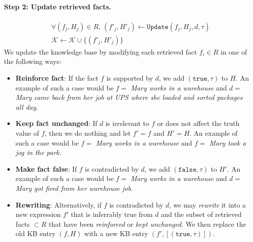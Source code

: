 \documentclass[11pt]{article}
\newcommand{\doc}{d}
\newcommand{\kb}{\mathcal{K}}
\newcommand{\fact}{f}
\newcommand{\facthist}{H}
\newcommand{\timestamp}{\tau}
\begin{document}
\paragraph{Step 2: Update retrieved facts.} 
\begin{align}
    &\forall (\fact_j, \facthist_j) \in R, \, (\fact'_j, \facthist'_j) \leftarrow \texttt{Update}(\fact_j,\facthist_j,\doc,\timestamp) \nonumber \\
    & \kb \gets \kb \cup \{(\fact'_j, \facthist'_j)\}
\end{align}
We update the knowledge base by modifying each retrieved fact $f_i\in R$ in one of the following ways:
\begin{itemize}
    \item \textbf{Reinforce fact}: If the fact $\fact$ is supported by $\doc$, we add $(\texttt{true}, \timestamp)$ to $\facthist$. An example of such a case would be $\fact =$ \textit{Mary works in a warehouse} and $\doc =$ \textit{Mary came back from her job at UPS where she loaded and sorted packages all day}.
    
    \item \textbf{Keep fact unchanged}: If $\doc$ is irrelevant to $\fact$ or does not affect the truth value of $\fact$, then we do nothing and let $\fact' = \fact$ and $\facthist' = \facthist$. An example of such a case would be $\fact =$ \textit{Mary works in a warehouse} and $\fact = $ \textit{Mary took a jog in the park}.

    \item \textbf{Make fact false}: If $\fact$ is contradicted by $\doc$, we add $(\texttt{false}, \tau)$ to $\facthist'$. An example of such a case would be $\fact =$ \textit{Mary works in a warehouse} and $\doc = $ \textit{Mary got fired from her warehouse job}.

    \item \textbf{Rewriting}: Alternatively, if $\fact$ is contradicted by $\doc$, we may \textit{rewrite} it into a new expression $\fact'$ that is inferrably true from $\doc$ and the subset of retrieved facts $\subset R$ that have been \textit{reinforced} or \textit{kept unchanged}. %
    We then replace the old KB entry $(\fact, H)$ with a new KB entry $(\fact', [(\texttt{true},\tau)])$.
\end{itemize}
\end{document}
